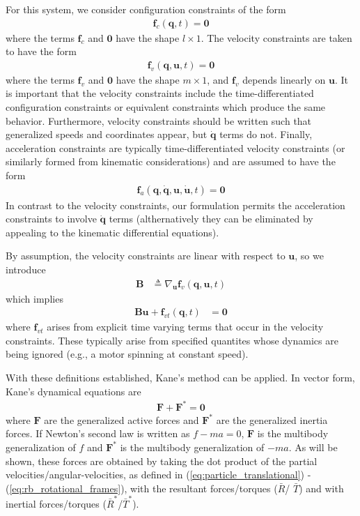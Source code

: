\documentclass[smallcondensed,final]{svjour3}                     %
\begin{document}
For this system, we consider configuration constraints of the form
\begin{align}
\label{eq:configuration_constraints}
\mathbf{f}_c(\mathbf{q}, t) = \mathbf{0}
\end{align}
where the terms $\mathbf{f}_c$ and $\mathbf{0}$ have the shape $l \times 1$.
The velocity constraints are taken to have the form
\begin{align}
\label{eq:velocity_constraints}
\mathbf{f}_v(\mathbf{q}, \mathbf{u}, t) = \mathbf{0}
\end{align}
where the terms $\mathbf{f}_v$ and $\mathbf{0}$ have the shape $m \times 1$,
and $\mathbf{f}_v$ depends linearly on $\mathbf{u}$.  It is important that the
velocity constraints include the time-differentiated configuration constraints
or equivalent constraints which produce the same behavior. Furthermore,
velocity constraints should be written such that generalized speeds and
coordinates appear, but $\dot{\mathbf{q}}$ terms do not.  Finally, acceleration
constraints are typically time-differentiated velocity constraints (or
similarly formed from kinematic considerations) and are assumed to have the
form
\begin{align}
\label{eq:acceleration_constraints}
\mathbf{f}_a(\mathbf{q}, \dot{\mathbf{q}}, \mathbf{u}, \dot{\mathbf{u}}, t) =
\mathbf{0}
\end{align}
In contrast to the velocity constraints, our formulation permits the
acceleration constraints to involve $\dot{\mathbf{q}}$ terms (althernatively
they can be eliminated by appealing to the kinematic differential equations).

By assumption, the velocity constraints are linear with respect to
$\mathbf{u}$, so we introduce
\begin{align}
\label{eq:constraint_B}
\mathbf{B} &\triangleq \nabla_{\mathbf{u}} \mathbf{f}_v (\mathbf{q}, \mathbf{u},
t)
\end{align}
which implies
\begin{align}
\label{eq:constraint_Bu0}
\mathbf{B}\mathbf{u} + \mathbf{f}_{vt}(\mathbf{q}, t) &= \mathbf{0}
\end{align}
where $\mathbf{f}_{vt}$ arises from explicit time varying terms that occur in
the velocity constraints. These typically arise from specified quantites whose
dynamics are being ignored (e.g., a motor spinning at constant speed).

With these definitions established, Kane's method can be applied. In vector
form, Kane's dynamical equations are
\begin{align}
\label{eq:kanes_eq}
\mathbf{F} + \mathbf{F}^* = \mathbf{0}
\end{align}
where $\mathbf{F}$ are the generalized active forces and $\mathbf{F}^*$ are the
generalized inertia forces. If Newton's second law is written as $f - ma = 0$,
$\mathbf{F}$ is the multibody generalization of $f$ and $\mathbf{F}^*$ is the
multibody generalization of $-ma$. As will be shown, these forces are obtained
by taking the dot product of the partial velocities/angular-velocities, as
defined in (\ref{eq:particle_translational}) - (\ref{eq:rb_rotational_frames}),
with the resultant forces/torques ($\bar{R}$/ $\bar{T}$) and with inertial
forces/torques ($\bar{R}^*$/$\bar{T}^*$).
\end{document}
